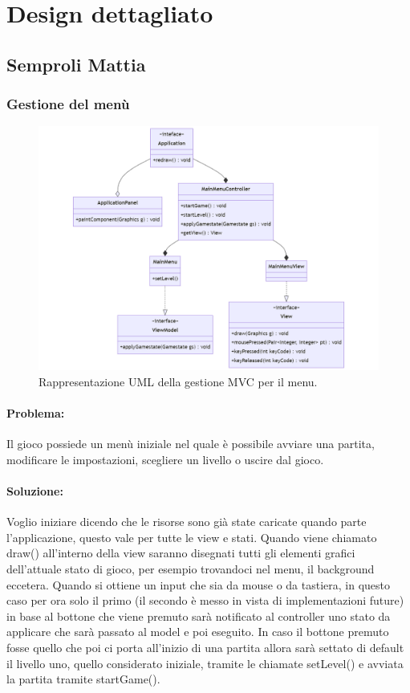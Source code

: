 \documentclass[a4paper,12pt]{report}
\begin{document}
\section{Design dettagliato}
\subsection{Semproli Mattia}

\subsubsection{Gestione del menù}

\begin{figure}[H]
\centering{}
\includegraphics[width=\textwidth]{img/menu.png}
\caption{Rappresentazione UML della gestione MVC per il menu.}
\end{figure}

\paragraph{Problema:}
Il gioco possiede un menù iniziale nel quale è possibile avviare una partita, modificare le impostazioni, scegliere un livello o uscire dal gioco.

\paragraph{Soluzione:}
Voglio iniziare dicendo che le risorse sono già state caricate quando parte l’applicazione, questo vale per tutte le view e stati. Quando viene chiamato draw() all’interno della view saranno disegnati tutti gli elementi grafici dell’attuale stato di gioco, per esempio trovandoci nel menu, il background eccetera. Quando si ottiene un input che sia da mouse o da tastiera, in questo caso per ora solo il primo (il secondo è messo in vista di implementazioni future) in base al bottone che viene premuto sarà notificato al controller uno stato da applicare che sarà passato al model e poi eseguito. In caso il bottone premuto fosse quello che poi ci porta all’inizio di una partita allora sarà settato di default il livello uno, quello considerato iniziale, tramite le chiamate setLevel() e avviata la partita tramite startGame().
\end{document}
